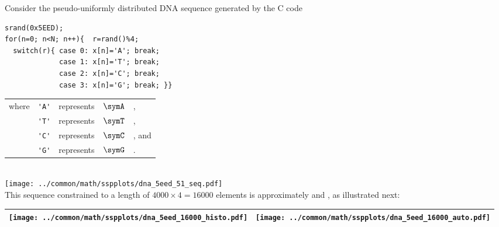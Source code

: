 \begin{example}
\label{ex:dna_5eed}
Consider the pseudo-uniformly distributed DNA sequence generated by the C code\footnotemark 
\\\begin{minipage}{85mm}%
\begin{lstlisting}
srand(0x5EED);
for(n=0; n<N; n++){  r=rand()%4;
  switch(r){ case 0: x[n]='A'; break;
             case 1: x[n]='T'; break;
             case 2: x[n]='C'; break;
             case 3: x[n]='G'; break; }}
\end{lstlisting}
\end{minipage}%
\hspace{10mm}%
\begin{tabular}{lclcl}
  where & \lstinline!'A'! &represents& $\symA$ &,
     \\ & \lstinline!'T'! &represents& $\symT$ &,
     \\ & \lstinline!'C'! &represents& $\symC$ &, and
     \\ & \lstinline!'G'! &represents& $\symG$ &.
\end{tabular}
  \\\texttt{[image: ../common/math/sspplots/dna\_5eed\_51\_seq.pdf]}\\
This sequence constrained to a length of $4000\times4=16000$ elements is approximately  and , 
as illustrated next:
  \\\begin{tabular}{|>{\scs}c|>{\scs}c|}
       \hline
       \texttt{[image: ../common/math/sspplots/dna\_5eed\_16000\_histo.pdf]}%
      &\texttt{[image: ../common/math/sspplots/dna\_5eed\_16000\_auto.pdf]}%
     \\\hline
  \end{tabular}
\end{example}


